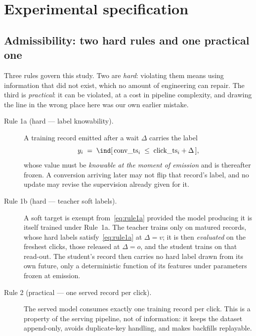 %
\section{Experimental specification}\label{app:spec}

\subsection{Admissibility: two hard rules and one practical one}\label{app:rules}

Three rules govern this study. Two are \emph{hard}: violating them means using information that did
not exist, which no amount of engineering can repair. The third is \emph{practical}: it can be
violated, at a cost in pipeline complexity, and drawing the line in the wrong place here was our
own earlier mistake.

\begin{description}
\item[Rule 1a (hard --- label knowability).] A training record emitted after a wait $\Delta$
  carries the label
  \begin{equation}\label{eq:rule1a}
  y_i \;=\; \ind[\,\text{conv\_ts}_i \;\le\; \text{click\_ts}_i + \Delta\,],
  \end{equation}
  whose value must be \emph{knowable at the moment of emission} and is thereafter frozen. A
  conversion arriving later may not flip that record's label, and no update may revise the
  supervision already given for it.

\item[Rule 1b (hard --- teacher soft labels).] A soft target is exempt from~\eqref{eq:rule1a}
  provided the model producing it is itself trained under Rule~1a. The teacher trains only on
  matured records, whose hard labels satisfy~\eqref{eq:rule1a} at $\Delta=v$; it is then
  \emph{evaluated} on the freshest clicks, those released at $\Delta=o$, and the student trains on
  that read-out. The student's record then carries no hard label drawn from its own future, only a
  deterministic function of its features under parameters frozen at emission.

\item[Rule 2 (practical --- one served record per click).] The served model consumes exactly one
  training record per click. This is a property of the serving pipeline, not of information: it
  keeps the dataset append-only, avoids duplicate-key handling, and makes backfills replayable.
\end{description}

